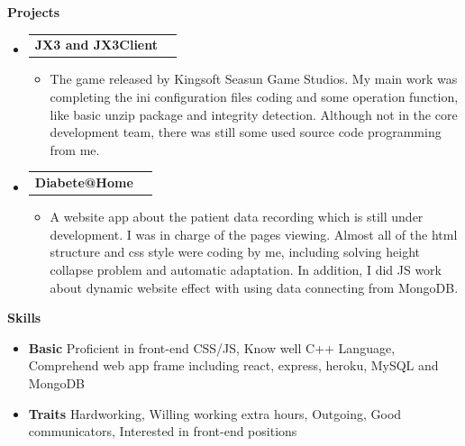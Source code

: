 \documentclass[letterpaper,12pt]{article}[leftmargin=*]
\makeatletter
\def \entryspacing {-0pt}
\renewcommand{\section}[2]{\vspace{5pt}
  \colorbox{secondary}{\color{white}\raggedbottom\normalsize\textbf{{#1}{\hspace{7pt}#2}}}
}
\newcommand{\resumeEntryStart}{\begin{itemize}[leftmargin=2.5mm]}
\newcommand{\resumeEntryEnd}{\end{itemize}\vspace{\entryspacing}}
\newcommand{\resumeItemListStart}{\begin{itemize}[leftmargin=4.5mm]}
\newcommand{\resumeItemListEnd}{\end{itemize}}
\newcommand{\resumeItem}[1]{
  \item\small{
    {#1 \vspace{-2pt}}
  }
}
\newcommand{\resumeEntryTD}[2]{
  \vspace{-1pt}\item[]
    \begin{tabularx}{0.97\textwidth}{X@{\hspace{60pt}}r}
      \textbf{\color{primary}#1} & {\firabook\color{accent}\small#2} \\
    \end{tabularx}\vspace{-6pt}
}
\newcommand{\resumeEntryS}[2]{
  \item[]\small{
    \textbf{\color{primary}#1 }{ #2 \vspace{-6pt}}
  }
}
\makeatother
\begin{document}
\section{\faFlask}{Projects}

  \resumeEntryStart
    \resumeEntryTD
      {JX3 and JX3Client}{}
    \resumeItemListStart
      \resumeItem {The game released by Kingsoft Seasun Game Studios. My main work was completing the ini configuration files coding and some operation function, like basic unzip package and integrity detection. Although not in the core development team, there was still some used source code programming from me.}
    \resumeItemListEnd
  \resumeEntryEnd

  \resumeEntryStart
    \resumeEntryTD
      {Diabete@Home}{}
    \resumeItemListStart
      \resumeItem {A website app about the patient data recording which is still under development. I was in charge of the pages viewing. Almost all of the html structure and css style were coding by me, including solving height collapse problem and automatic adaptation. In addition, I did JS work about dynamic website effect with using data connecting from MongoDB.}
    \resumeItemListEnd
  \resumeEntryEnd
  

\section{\faGears}{Skills}
 \resumeEntryStart
  \resumeEntryS{Basic } {Proficient in front-end CSS/JS, Know well C++ Language, Comprehend web app frame including react, express, heroku, MySQL and MongoDB}
  \resumeEntryS{Traits } {Hardworking, Willing working extra hours, Outgoing, Good communicators, Interested in front-end positions}
 \resumeEntryEnd
\end{document}
